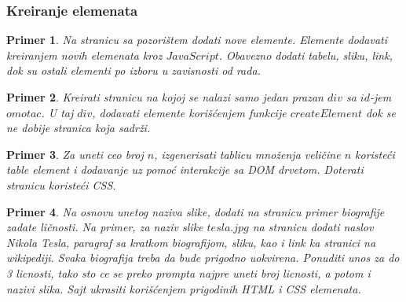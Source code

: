\documentclass[a4paper]{article}
\newtheorem{primer}{Primer}[section]
\begin{document}
\subsubsection{Kreiranje elemenata}
\begin{primer}
Na stranicu sa pozorištem dodati nove elemente. Elemente dodavati kreiranjem novih elemenata kroz $JavaScript$. Obavezno dodati tabelu, sliku, link, dok su ostali elementi po izboru u zavisnosti od rada.
\end{primer}

\begin{primer}
Kreirati stranicu na kojoj se nalazi samo jedan prazan $div$ sa $id$-jem $omotac$. U taj $div$, dodavati elemente korišćenjem funkcije $createElement$ dok se ne dobije stranica koja sadrži.
\end{primer}

\begin{primer}
Za uneti ceo broj $n$, izgenerisati tablicu množenja veličine $n$ koristeći table element i dodavanje uz pomoć interakcije sa DOM drvetom. Doterati stranicu koristeći CSS.
\end{primer}

\begin{primer}
Na osnovu unetog naziva slike, dodati na stranicu primer biografije zadate ličnosti. Na primer, za naziv slike $tesla.jpg$ na stranicu dodati naslov Nikola Tesla, paragraf sa kratkom biografijom, sliku, kao i link ka stranici na wikipediji. Svaka biografija treba da bude prigodno uokvirena. Ponuditi unos za do 3 licnosti, tako sto ce se preko prompta najpre uneti broj licnosti, a potom i nazivi slika. Sajt ukrasiti korišćenjem prigodinih HTML i CSS elemenata.
\end{primer}
\end{document}
